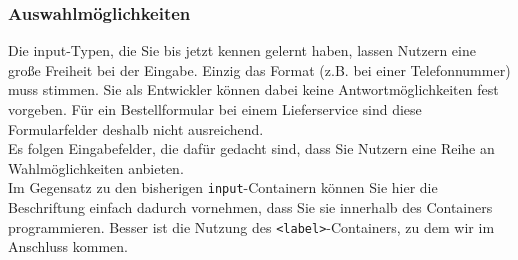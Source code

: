 \subsubsection{Auswahlmöglichkeiten}

Die input-Typen, die Sie bis jetzt kennen gelernt haben, lassen Nutzern eine große Freiheit bei der Eingabe. Einzig das Format (z.B. bei einer Telefonnummer) muss stimmen. Sie als Entwickler können dabei keine Antwortmöglichkeiten fest vorgeben. Für ein Bestellformular bei einem Lieferservice sind diese Formularfelder deshalb nicht ausreichend.\\

Es folgen Eingabefelder, die dafür gedacht sind, dass Sie Nutzern eine Reihe an Wahlmöglichkeiten anbieten.\\

Im Gegensatz zu den bisherigen \verb|input|-Containern können Sie hier die Beschriftung einfach dadurch vornehmen, dass Sie sie innerhalb des Containers programmieren. Besser ist die Nutzung des \verb|<label>|-Containers, zu dem wir im Anschluss kommen.\\

